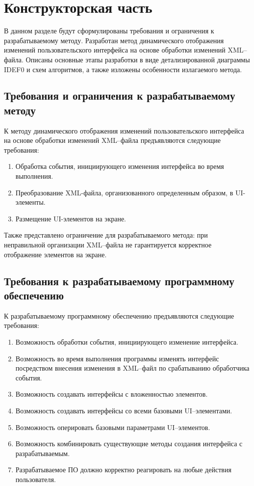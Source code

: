 \section{Конструкторская часть}

В данном разделе будут сформулированы требования и ограничения к разрабатываемому методу. 
Разработан метод динамического отображения изменений пользовательского интерфейса на основе обработки изменений XML--файла.
Описаны основные этапы разработки в виде детализированной диаграммы IDEF0 и схем алгоритмов, а также изложены особенности излагаемого метода. 

\subsection{Требования и ограничения к разрабатываемому методу}

К методу динамического отображения изменений пользовательского интерфейса на основе обработки изменений XML--файла предъявляются следующие требования:
\begin{enumerate}
	\item Обработка события, инициирующего изменения интерфейса во время выполнения.
	\item Преобразование XML-файла, организованного определенным образом, в UI-элементы.
	\item Размещение UI-элементов на экране.
\end{enumerate}
	
Также представлено ограничение для разрабатываемого метода: при неправильной организации XML--файла не гарантируется корректное отображение элементов на экране.




\subsection{Требования к разрабатываемому программному обеспечению}

К разрабатываемому программному обеспечению предъявляются следующие требования:
\begin{enumerate}
	\item Возможность обработки события, инициирующего изменение интерфейса.
	\item Возможность во время выполнения программы изменять интерфейс посредством внесения изменения в XML--файл по срабатыванию обработчика события.
	\item Возможность создавать интерфейсы с вложенностью элементов.
	\item Возможность создавать интерфейсы со всеми базовыми UI--элементами.
	\item Возможность оперировать базовыми параметрами UI--элементов.
	\item Возможность комбинировать существующие методы создания интерфейса с разрабатываемым.
	\item Разрабатываемое ПО должно корректно реагировать на любые действия пользователя.
\end{enumerate}


